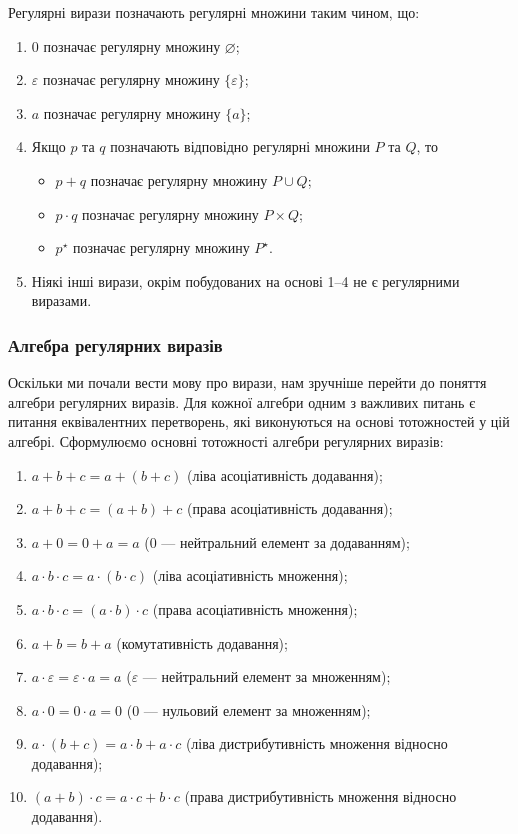 Регулярні вирази позначають регулярні множини таким чином, що:
\begin{enumerate}
	\item $0$ позначає регулярну множину $\varnothing$;
	\item $\varepsilon$ позначає регулярну множину $\{\varepsilon\}$;
	\item $a$ позначає регулярну множину $\{a\}$;
	\item Якщо $p$ та $q$ позначають відповідно регулярні множини $P$ та $Q$, то
	\begin{itemize}
		\item $p + q$ позначає регулярну множину $P \cup Q$;
		\item $p \cdot q$ позначає регулярну множину $P \times Q$;
		\item $p^\star$ позначає регулярну множину $P^\star$.
	\end{itemize}
	\item Ніякі інші вирази, окрім побудованих на основі 1--4 не є регулярними виразами.
\end{enumerate}

\subsubsection{Алгебра регулярних виразів}

Оскільки ми почали вести мову про вирази, нам зручніше перейти до поняття алгебри регулярних виразів. Для кожної алгебри одним з важливих питань є питання еквівалентних перетворень, які виконуються на основі тотожностей у цій алгебрі. Сформулюємо основні тотожності алгебри регулярних виразів:
\begin{enumerate}
	\item $a + b + c = a + (b + c)$ (ліва асоціативність додавання);
	\item $a + b + c = (a + b) + c$ (права асоціативність додавання);
	\item $a + 0 = 0 + a = a$ ($0$ --- нейтральний елемент за додаванням);
	\item $a \cdot b \cdot c = a \cdot (b \cdot c)$ (ліва асоціативність множення);
	\item $a \cdot b \cdot c = (a \cdot b) \cdot c$ (права асоціативність множення);
	\item $a + b = b + a$ (комутативність додавання);
	\item $a \cdot \varepsilon = \varepsilon \cdot a = a$ ($\varepsilon$ --- нейтральний елемент за множенням);
	\item $a \cdot 0 = 0 \cdot a = 0$ ($0$ --- нульовий елемент за множенням);
	\item $a \cdot (b + c) = a \cdot b + a \cdot c$ (ліва дистрибутивність множення відносно додавання);
	\item $(a + b) \cdot c = a \cdot c + b \cdot c$ (права дистрибутивність множення відносно додавання).
\end{enumerate}

